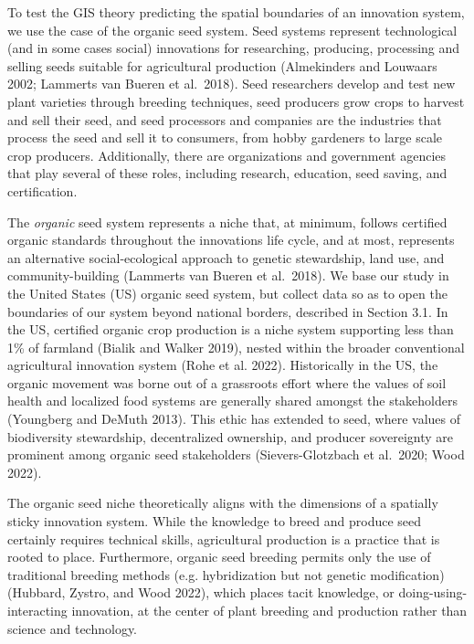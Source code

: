 \documentclass[twoside,12pt,final]{ucthesis-CA2012}
\begin{document}
\begin{ucmainmatter}
To test the GIS theory predicting the spatial boundaries of an
innovation system, we use the case of the organic seed system. Seed
systems represent technological (and in some cases social) innovations
for researching, producing, processing and selling seeds suitable for
agricultural production (Almekinders and Louwaars 2002; Lammerts van
Bueren et al.~2018). Seed
researchers develop and test new plant varieties through breeding
techniques, seed producers grow crops to harvest and sell their seed,
and seed processors and companies are the industries that process the
seed and sell it to consumers, from hobby gardeners to large scale crop
producers. Additionally, there are organizations and government agencies
that play several of these roles, including research, education, seed
saving, and certification.

The \emph{organic} seed system represents a niche that, at minimum, follows
certified organic standards throughout the innovation\textquotesingle s life cycle, and
at most, represents an alternative social-ecological approach to genetic
stewardship, land use, and community-building (Lammerts van Bueren et
al.~2018). We base our
study in the United States (US) organic seed system, but collect data so
as to open the boundaries of our system beyond national borders,
described in Section 3.1. In the US, certified organic crop production
is a niche system supporting less than 1\% of farmland (Bialik and
Walker 2019), nested within
the broader conventional agricultural innovation system (Rohe et al.
2022). Historically in the
US, the organic movement was borne out of a grassroots effort where the
values of soil health and localized food systems are generally shared
amongst the stakeholders (Youngberg and DeMuth
2013). This ethic has
extended to seed, where values of biodiversity stewardship,
decentralized ownership, and producer sovereignty are prominent among
organic seed stakeholders (Sievers-Glotzbach et al.~2020; Wood
2022).

The organic seed niche theoretically aligns with the dimensions of a
spatially sticky innovation system. While the knowledge to breed and
produce seed certainly requires technical skills, agricultural
production is a practice that is rooted to place. Furthermore, organic
seed breeding permits only the use of traditional breeding methods (e.g.
hybridization but not genetic modification) (Hubbard, Zystro, and Wood
2022), which places tacit
knowledge, or \textquotesingle doing-using-interacting\textquotesingle{} innovation, at the center of
plant breeding and production rather than science and technology.


\end{ucmainmatter}
\end{document}
